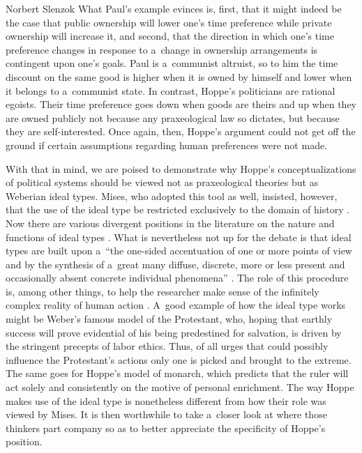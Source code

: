 \begin{artengenv}{Norbert Slenzok}
What Paul's example evinces is, first, that it might indeed be the case that public ownership will lower one's time preference while private ownership will increase it, and second, that the direction in which one's time preference changes in response to a~change in ownership arrangements is contingent upon one's goals. Paul is a~communist altruist, so to him the time discount on the same good is higher when it is owned by himself and lower when it belongs to a~communist state. In contrast, Hoppe's politicians are rational egoists. Their time preference goes down when goods are theirs and up when they are owned publicly not because any praxeological law so dictates, but because they are self-interested. Once again, then, Hoppe's argument could not get off the ground if certain assumptions regarding human preferences were not made.



With that in mind, we are poised to demonstrate why Hoppe's conceptualizations of political systems should be viewed not as praxeological theories but as Weberian ideal types. Mises, who adopted this tool as well, insisted, however, that the use of the ideal type be restricted exclusively to the domain of history 
\parencites[][pp.59–64]{mises_human_1998}[][pp.315–322]{mises_theory_2007}. %
 Now there are various divergent positions in the literature on the nature and functions of ideal types 
\parencite[see][pp.35–119]{kuninski_myslenie_1980}. %
 What is nevertheless not up for the debate is that ideal types are built upon a~``the one-sided accentuation of one or more points of view and by the synthesis of a~great many diffuse, discrete, more or less present and occasionally absent concrete individual phenomena'' 
\parencites[][p.90]{weber_methodology_1949}[see also][pp.315–320]{mises_theory_2007}. %
 The role of this procedure is, among other things, to help the researcher make sense of the infinitely complex reality of human action 
\parencite[][p.320]{mises_theory_2007}. %
 A~good example of how the ideal type works might be Weber's 
\parencite*[][]{weber_protestant_2001} %
 famous model of the Protestant, who, hoping that earthly success will prove evidential of his being predestined for salvation, is driven by the stringent precepts of labor ethics. Thus, of all urges that could possibly influence the Protestant's actions only one is picked and brought to the extreme. The same goes for Hoppe's model of monarch, which predicts that the ruler will act solely and consistently on the motive of personal enrichment. The way Hoppe makes use of the ideal type is nonetheless different from how their role was viewed by Mises. It is then worthwhile to take a~closer look at where those thinkers part company so as to better appreciate the specificity of Hoppe's position.




\end{artengenv}
